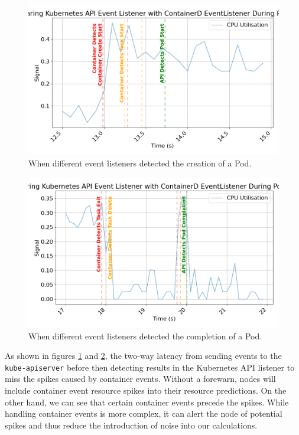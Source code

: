 \begin{figure}[H]
    \centering
    \includegraphics[width=\textwidth]{images/event-comparison-start.png}
    \caption{When different event listeners detected the creation of a Pod.}
    \label{fig:event-evaluation-start}
\end{figure}

\begin{figure}[H]
    \centering
    \includegraphics[width=\textwidth]{images/event-comparison-end.png}
    \caption{When different event listeners detected the completion of a Pod.}
    \label{fig:event-evaluation-end}
\end{figure}

As shown in figures \ref{fig:event-evaluation-start} and
\ref{fig:event-evaluation-end}, the two-way latency from sending events
to the \verb|kube-apiserver| before then detecting results in the Kubernetes API
listener to miss the spikes caused by container events. Without a forewarn, nodes
will include container event resource spikes into their resource predictions. On
the other hand, we can see that certain container events precede the spikes.
While handling container events is more complex, it can alert the node of
potential spikes and thus reduce the introduction of noise into our
calculations.

